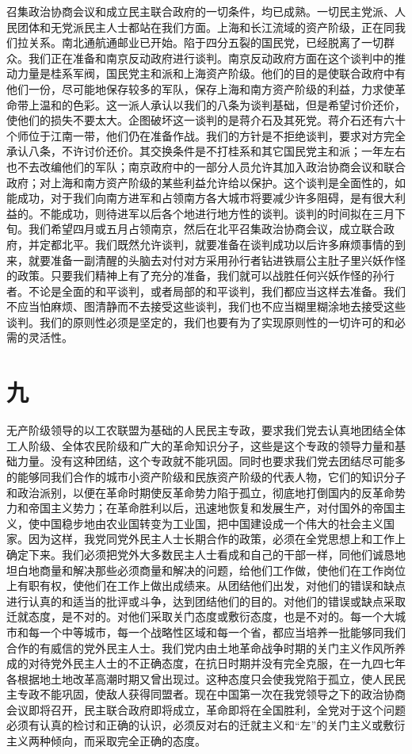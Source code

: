 召集政治协商会议和成立民主联合政府的一切条件，均已成熟。一切民主党派、人民团体和无党派民主人士都站在我们方面。上海和长江流域的资产阶级，正在同我们拉关系。南北通航通邮业已开始。陷于四分五裂的国民党，已经脱离了一切群众。我们正在准备和南京反动政府进行谈判。南京反动政府方面在这个谈判中的推动力量是桂系军阀，国民党主和派和上海资产阶级。他们的目的是使联合政府中有他们一份，尽可能地保存较多的军队，保存上海和南方资产阶级的利益，力求使革命带上温和的色彩。这一派人承认以我们的八条为谈判基础，但是希望讨价还价，使他们的损失不要太大。企图破坏这一谈判的是蒋介石及其死党。蒋介石还有六十个师位于江南一带，他们仍在准备作战。我们的方针是不拒绝谈判，要求对方完全承认八条，不许讨价还价。其交换条件是不打桂系和其它国民党主和派；一年左右也不去改编他们的军队；南京政府中的一部分人员允许其加入政治协商会议和联合政府；对上海和南方资产阶级的某些利益允许给以保护。这个谈判是全面性的，如能成功，对于我们向南方进军和占领南方各大城市将要减少许多阻碍，是有很大利益的。不能成功，则待进军以后各个地进行地方性的谈判。谈判的时间拟在三月下旬。我们希望四月或五月占领南京，然后在北平召集政治协商会议，成立联合政府，并定都北平。我们既然允许谈判，就要准备在谈判成功以后许多麻烦事情的到来，就要准备一副清醒的头脑去对付对方采用孙行者钻进铁扇公主肚子里兴妖作怪的政策。只要我们精神上有了充分的准备，我们就可以战胜任何兴妖作怪的孙行者。不论是全面的和平谈判，或者局部的和平谈判，我们都应当这样去准备。我们不应当怕麻烦、图清静而不去接受这些谈判，我们也不应当糊里糊涂地去接受这些谈判。我们的原则性必须是坚定的，我们也要有为了实现原则性的一切许可的和必需的灵活性。

\section*{九}

无产阶级领导的以工农联盟为基础的人民民主专政，要求我们党去认真地团结全体工人阶级、全体农民阶级和广大的革命知识分子，这些是这个专政的领导力量和基础力量。没有这种团结，这个专政就不能巩固。同时也要求我们党去团结尽可能多的能够同我们合作的城市小资产阶级和民族资产阶级的代表人物，它们的知识分子和政治派别，以便在革命时期使反革命势力陷于孤立，彻底地打倒国内的反革命势力和帝国主义势力；在革命胜利以后，迅速地恢复和发展生产，对付国外的帝国主义，使中国稳步地由农业国转变为工业国，把中国建设成一个伟大的社会主义国家。因为这样，我党同党外民主人士长期合作的政策，必须在全党思想上和工作上确定下来。我们必须把党外大多数民主人士看成和自己的干部一样，同他们诚恳地坦白地商量和解决那些必须商量和解决的问题，给他们工作做，使他们在工作岗位上有职有权，使他们在工作上做出成绩来。从团结他们出发，对他们的错误和缺点进行认真的和适当的批评或斗争，达到团结他们的目的。对他们的错误或缺点采取迁就态度，是不对的。对他们采取关门态度或敷衍态度，也是不对的。每一个大城市和每一个中等城市，每一个战略性区域和每一个省，都应当培养一批能够同我们合作的有威信的党外民主人士。我们党内由土地革命战争时期的关门主义作风所养成的对待党外民主人士的不正确态度，在抗日时期并没有完全克服，在一九四七年各根据地土地改革高潮时期又曾出现过。这种态度只会使我党陷于孤立，使人民民主专政不能巩固，使敌人获得同盟者。现在中国第一次在我党领导之下的政治协商会议即将召开，民主联合政府即将成立，革命即将在全国胜利，全党对于这个问题必须有认真的检讨和正确的认识，必须反对右的迁就主义和“左”的关门主义或敷衍主义两种倾向，而采取完全正确的态度。

